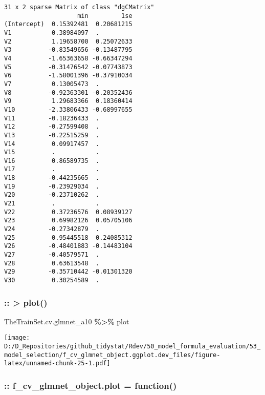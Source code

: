 \documentclass[
]{article}
\newenvironment{Shaded}{\begin{snugshade}}{\end{snugshade}}
\newcommand{\NormalTok}[1]{#1}
\newcommand{\SpecialCharTok}[1]{\textcolor[rgb]{0.81,0.36,0.00}{\textbf{#1}}}
\begin{document}
\begin{verbatim}
31 x 2 sparse Matrix of class "dgCMatrix"
                    min         1se
(Intercept)  0.15392481  0.20681215
V1           0.38984097  .         
V2           1.19658700  0.25072633
V3          -0.83549656 -0.13487795
V4          -1.65363658 -0.66347294
V5          -0.31476542 -0.07743873
V6          -1.58001396 -0.37910034
V7           0.13005473  .         
V8          -0.92363301 -0.20352436
V9           1.29683366  0.18360414
V10         -2.33806433 -0.68997655
V11         -0.18236433  .         
V12         -0.27599408  .         
V13         -0.22515259  .         
V14          0.09917457  .         
V15          .           .         
V16          0.86589735  .         
V17          .           .         
V18         -0.44235665  .         
V19         -0.23929034  .         
V20         -0.23710262  .         
V21          .           .         
V22          0.37236576  0.08939127
V23          0.69982126  0.05705106
V24         -0.27342879  .         
V25          0.95445518  0.24085312
V26         -0.48401883 -0.14483104
V27         -0.40579571  .         
V28          0.63613548  .         
V29         -0.35710442 -0.01301320
V30          0.30254589  .         
\end{verbatim}

\hypertarget{plot}{%
\subsubsection{:: \textbar\textgreater{} plot()}\label{plot}}

\begin{Shaded}
\begin{Highlighting}[]
\NormalTok{TheTrainSet.cv.glmnet\_a10 }\SpecialCharTok{\%\textgreater{}\%}\NormalTok{ plot}
\end{Highlighting}
\end{Shaded}

\texttt{[image: D:/D\_Repositories/github\_tidystat/Rdev/50\_model\_formula\_evaluation/53\_model\_selection/f\_cv\_glmnet\_object.ggplot.dev\_files/figure-latex/unnamed-chunk-25-1.pdf]}

\hypertarget{f_cv_glmnet_object.plot-function}{%
\subsubsection{:: f\_cv\_glmnet\_object.plot =
function()}\label{f_cv_glmnet_object.plot-function}}
\end{document}
